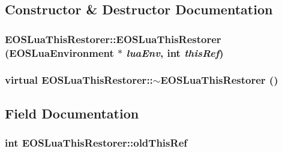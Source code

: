 \subsection{Constructor \& Destructor Documentation}
\hypertarget{classEOSLuaThisRestorer_81ca0a43271615529a47f3983c5ffe30}{
\subsubsection[{EOSLuaThisRestorer}]{\setlength{\rightskip}{0pt plus 5cm}EOSLuaThisRestorer::EOSLuaThisRestorer ({\bf EOSLuaEnvironment} $\ast$ {\em luaEnv}, \/  int {\em thisRef})}}
\label{classEOSLuaThisRestorer_81ca0a43271615529a47f3983c5ffe30}


\hypertarget{classEOSLuaThisRestorer_f674e78a80a788f6ceaaf3762572ab9d}{
\subsubsection[{$\sim$EOSLuaThisRestorer}]{\setlength{\rightskip}{0pt plus 5cm}virtual EOSLuaThisRestorer::$\sim$EOSLuaThisRestorer ()}}
\label{classEOSLuaThisRestorer_f674e78a80a788f6ceaaf3762572ab9d}




\subsection{Field Documentation}
\hypertarget{classEOSLuaThisRestorer_ab1eec278bb8cda42e152ec7d82c8d3a}{
\subsubsection[{oldThisRef}]{\setlength{\rightskip}{0pt plus 5cm}int {\bf EOSLuaThisRestorer::oldThisRef}}}
\label{classEOSLuaThisRestorer_ab1eec278bb8cda42e152ec7d82c8d3a}


